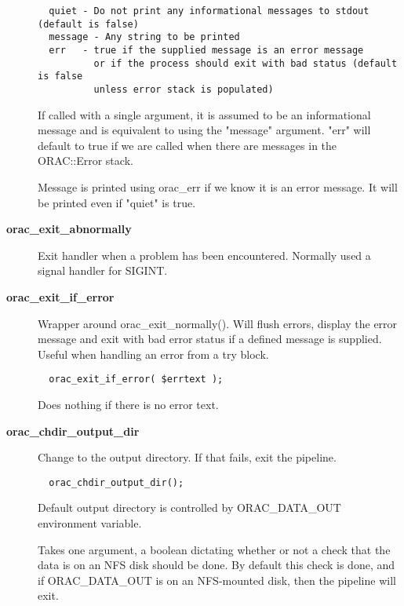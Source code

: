 \begin{description}
\begin{verbatim}
  quiet - Do not print any informational messages to stdout (default is false)
  message - Any string to be printed
  err   - true if the supplied message is an error message
          or if the process should exit with bad status (default is false
          unless error stack is populated)
\end{verbatim}


If called with a single argument, it is assumed to be an informational
message and is equivalent to using the "message" argument. "err" will
default to true if we are called when there are messages in the
ORAC::Error stack.



Message is printed using orac\_err if we know it is an error message.
It will be printed even if "quiet" is true.


\item[{\textbf{orac\_exit\_abnormally}}] \mbox{}

Exit handler when a problem has been encountered. Normally
used a signal handler for SIGINT.


\item[{\textbf{orac\_exit\_if\_error}}] \mbox{}

Wrapper around orac\_exit\_normally(). Will flush errors, display the error
message and exit with bad error status if a defined message is supplied.
Useful when handling an error from a try block.

\begin{verbatim}
  orac_exit_if_error( $errtext );
\end{verbatim}


Does nothing if there is no error text.


\item[{\textbf{orac\_chdir\_output\_dir}}] \mbox{}

Change to the output directory. If that fails, exit the pipeline.

\begin{verbatim}
  orac_chdir_output_dir();
\end{verbatim}


Default output directory is controlled by ORAC\_DATA\_OUT environment
variable.



Takes one argument, a boolean dictating whether or not a check that
the data is on an NFS disk should be done. By default this check is
done, and if ORAC\_DATA\_OUT is on an NFS-mounted disk, then the
pipeline will exit.

\end{description}
